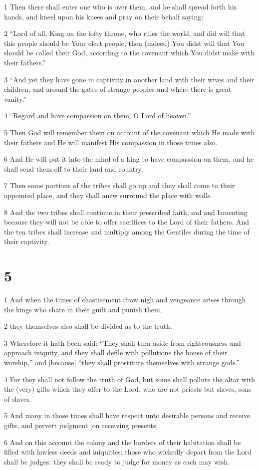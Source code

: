 \par 1 Then there shall enter one who is over them, and he shall spread forth his hands, and kneel upon his knees and pray on their behalf saying:
\par 2 “Lord of all, King on the lofty throne, who rules the world, and did will that this people should be Your elect people, then (indeed) You didst will that You should be called their God, according to the covenant which You didst make with their fathers.”
\par 3 “And yet they have gone in captivity in another land with their wives and their children, and around the gates of strange peoples and where there is great vanity.”
\par 4 “Regard and have compassion on them, O Lord of heaven.”
\par 5 Then God will remember them on account of the covenant which He made with their fathers and He will manifest His compassion in those times also.
\par 6 And He will put it into the mind of a king to have compassion on them, and he shall send them off to their land and country.
\par 7 Then some portions of the tribes shall go up and they shall come to their appointed place, and they shall anew surround the place with walls.
\par 8 And the two tribes shall continue in their prescribed faith, sad and lamenting because they will not be able to offer sacrifices to the Lord of their fathers. And the ten tribes shall increase and multiply among the Gentiles during the time of their captivity.

\chapter{5}

\par 1 And when the times of chastisement draw nigh and vengeance arises through the kings who share in their guilt and punish them,
\par 2 they themselves also shall be divided as to the truth.
\par 3 Wherefore it hath been said: “They shall turn aside from righteousness and approach iniquity, and they shall defile with pollutions the house of their worship,” and [because] “they shall prostitute themselves with strange gods.”
\par 4 For they shall not follow the truth of God, but some shall pollute the altar with the (very) gifts which they offer to the Lord, who are not priests but slaves, sons of slaves.
\par 5 And many in those times shall have respect unto desirable persons and receive gifts, and pervert judgment [on receiving presents].
\par 6 And on this account the colony and the borders of their habitation shall be filled with lawless deeds and iniquities: those who wickedly depart from the Lord shall be judges: they shall be ready to judge for money as each may wish.

